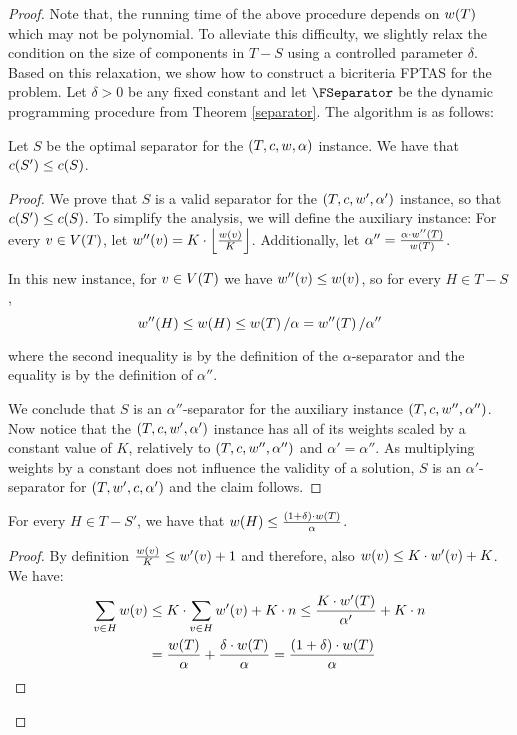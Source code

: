 \begin{theorem}
\begin{proof}
Note that, the running time of the above procedure depends on $w\mathopen{}\left( T \right)$ which may not be polynomial. 
To alleviate this difficulty, we slightly relax the condition on the size of components 
in $T-S$ using a controlled parameter $\delta$. 
Based on this relaxation, we show how to construct a bicriteria FPTAS for the problem. Let $\delta>0$ be any fixed constant and let $\FSeparator$ be the dynamic programming procedure from Theorem \ref{separator}.
        The algorithm is as follows:
        
        \begin{lemma}
            Let $S$ be the optimal separator for the $\mathopen{}\left( T, c, w, \alpha \right)$ instance. We have that $c\mathopen{}\left( S' \right)\leq c\mathopen{}\left( S \right)$.
            \begin{proof}
                We prove that $S$ is a valid separator for the $\mathopen{}\left( T, c, w', \alpha' \right)$ instance, so that $c\mathopen{}\left( S' \right)\leq c\mathopen{}\left( S \right)$.
                To simplify the analysis, we will define the auxiliary instance: For every $v\in V\mathopen{}\left( T \right)$, let $w''\mathopen{}\left( v \right) = K\cdot\mathopen{}\left\lfloor \frac{w\mathopen{}\left( v \right)}{K} \right\rfloor $. Additionally, let $ \alpha'' =\frac{\alpha \cdot w''\mathopen{}\left( T \right)}{w\mathopen{}\left( T \right)}$.
                
                In this new instance, for $v\in V\mathopen{}\left( T \right)$ we have $w''\mathopen{}\left( v \right)\leq w\mathopen{}\left( v \right)$, so for every $H\in T-S$, 
                $$w''\mathopen{}\left( H \right)\leq w\mathopen{}\left( H \right)\leq w\mathopen{}\left( T \right)/\alpha= w''\mathopen{}\left( T \right)/\alpha''$$
                
                where the second inequality is by the definition of the $\alpha$-separator and the equality is by the definition of $\alpha''$.
                
                We conclude that $S$ is an $\alpha''$-separator for the auxiliary instance $\mathopen{}\left( T, c, w'', \alpha'' \right)$. Now notice that the $\mathopen{}\left( T, c, w', \alpha' \right)$ instance has all of its weights scaled by a constant value of $K$, relatively to $\mathopen{}\left( T, c, w'', \alpha'' \right)$ and $\alpha' = \alpha''$. As multiplying weights by a constant does not influence the validity of a solution, $S$ is an $\alpha'$-separator for $\mathopen{}\left( T, w', c, \alpha' \right)$ and the claim follows.
            \end{proof}
        \end{lemma}
        \begin{lemma}
            For every $H\in T-S'$, we have that $w\mathopen{}\left( H \right)\leq\frac{\mathopen{}\left( 1+\delta \right)\cdot w\mathopen{}\left( T \right)}{\alpha}$.
        
            \begin{proof}
                By definition $ \frac{w\mathopen{}\left( v \right)}{K}\leq w'\mathopen{}\left( v \right)+1$ and therefore, also $w\mathopen{}\left( v \right)\leq K\cdot w'\mathopen{}\left( v \right)+K$. We have:
                \begin{align*}
                \sum_{v\in H}w\mathopen{}\left( v \right)&\leq K\cdot\sum_{v\in H}w'\mathopen{}\left( v \right)+K\cdot n\leq \frac{K\cdot w'\mathopen{}\left( T \right)}{\alpha'}+K\cdot n \\
                &= \frac{w\mathopen{}\left( T \right)}{\alpha} + \frac{\delta \cdot w\mathopen{}\left( T \right)}{\alpha}=\frac{\mathopen{}\left( 1+\delta \right)\cdot w\mathopen{}\left( T \right)}{\alpha}
                \end{align*}
                

\end{proof}
\end{lemma}
\end{proof}
\end{theorem}
